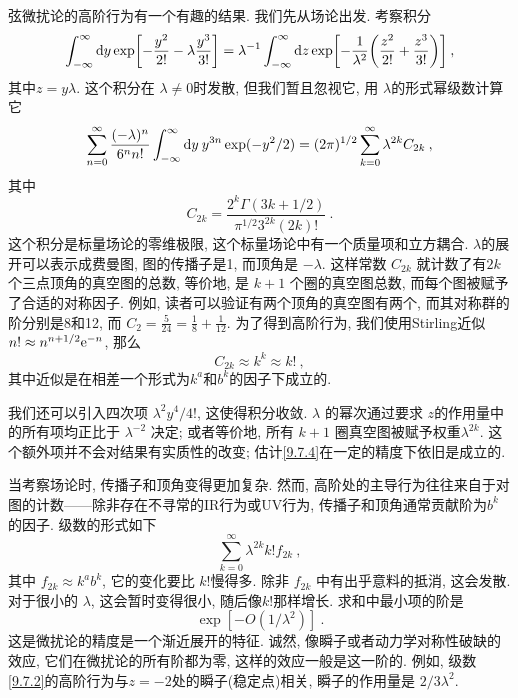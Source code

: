 弦微扰论的高阶行为有一个有趣的结果. 我们先从场论出发. 考察积分
\begin{equation}
	\int_{-\infty}^{\infty} \mathrm{d} y \exp \biggl[-\frac{y^{2}}{2!} - \lambda \frac{y^{3}}{3!}\biggr] = 
	\lambda^{-1} \int_{-\infty}^{\infty} \mathrm{d} z \exp \biggl[-\frac{1}{\lambda^{2}}\biggl(\frac{z^{2}}{2!}+\frac{z^{3}}{3!}\biggr)\biggr] \:,
	\label{9.7.1}
\end{equation}
其中$z=y \lambda $. 这个积分在 $\lambda \neq 0$时发散, 但我们暂且忽视它, 用 $\lambda$的形式幂级数计算它
\begin{equation}
	\sum_{n=0}^{\infty} \frac{(-\lambda)^{n}}{6^{n} n !} \int_{-\infty}^{\infty} \mathrm{d} y\: y^{3 n} 
	\exp (-y^{2} / 2) = (2 \pi)^{1 / 2} \sum_{k=0}^{\infty} \lambda^{2 k} C_{2 k} \:, \label{9.7.2}
\end{equation}
其中
\begin{equation}
	C_{2 k}=\frac{2^{k} \Gamma(3 k+1 / 2)}{\pi^{1 / 2} 3^{2 k}(2 k) !} \:. \label{9.7.3}
\end{equation}
这个积分是标量场论的零维极限, 这个标量场论中有一个质量项和立方耦合. $\lambda$的展开可以表示成费曼图, 图的传播子是1, 而顶角是 $-\lambda$. 
这样常数 $C_{2 k}$ 就计数了有$2 k$ 个三点顶角的真空图的总数, 等价地, 是 $k+1$ 个圈的真空图总数, 而每个图被赋予了合适的对称因子. 
例如, 读者可以验证有两个顶角的真空图有两个, 而其对称群的阶分别是8和12, 而 $C_{2}=\frac{5}{24}=\frac{1}{8}+\frac{1}{12}$. 
为了得到高阶行为, 我们使用Stirling近似 $n ! \approx n^{n+1 / 2} \mathrm{e}^{-n}$, 那么
\begin{equation}
	C_{2 k} \approx k^{k} \approx k ! \:, \label{9.7.4}
\end{equation}
其中近似是在相差一个形式为$k^{a}$和$b^{k}$的因子下成立的.

我们还可以引入四次项 $\lambda^{2} y^{4} / 4 !$, 这使得积分收敛. $\lambda$ 的幂次通过要求 $z$的作用量中的所有项均正比于 $\lambda^{-2} $ 决定; 
或者等价地, 所有 $k+1$ 圈真空图被赋予权重$\lambda^{2 k}$. 这个额外项并不会对结果有实质性的改变; 估计\eqref{9.7.4}在一定的精度下依旧是成立的.

当考察场论时, 传播子和顶角变得更加复杂. 然而, 高阶处的主导行为往往来自于对图的计数——除非存在不寻常的IR行为或UV行为, 传播子和顶角通常贡献阶为$b^{k}$的因子. 
级数的形式如下
\begin{equation}
	\sum_{k=0}^{\infty} \lambda^{2 k} k ! f_{2 k} \:, \label{9.7.5}
\end{equation}
其中 $f_{2 k} \approx k^{a} b^{k}$, 它的变化要比 $k !$慢得多. 除非 $f_{2 k}$ 中有出乎意料的抵消, 这会发散. 
对于很小的 $\lambda$, 这会暂时变得很小, 随后像$k!$那样增长. 求和中最小项的阶是
\begin{equation}
	\exp [-O(1 / \lambda^{2})] \:. \label{9.7.6}
\end{equation}
这是微扰论的精度是一个渐近展开的特征. 诚然, 像瞬子或者动力学对称性破缺的效应, 它们在微扰论的所有阶都为零, 这样的效应一般是这一阶的. 
例如, 级数 \eqref{9.7.2}的高阶行为与$z=-2$处的瞬子(稳定点)相关, 瞬子的作用量是 $2 / 3 \lambda^{2}$.

